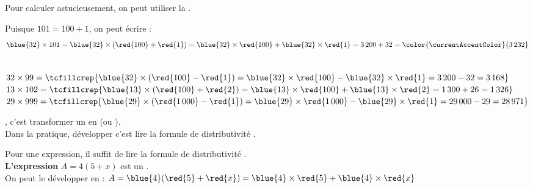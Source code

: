 \begin{Exemple}
    \vspace{-0.35cm}
    \begin{minipage}[t]{0.3\textwidth}\bclampe Pour calculer astucieusement, on peut utiliser la .\end{minipage}
    \hfill
    \begin{minipage}[t]{0.6\textwidth}
    Puisque $101 = 100 + 1$, on peut écrire :
    \[\blue{32} \times 101 = \blue{32} \times (\red{100} + \red{1}) = \blue{32} \times \red{100} + \blue{32} \times \red{1} = 3\,200 + 32 = \color{\currentAccentColor}{3\,232}\]
    \end{minipage}\\

    $32\times 99=\tcfillcrep{\blue{32} \times (\red{100} - \red{1}) = \blue{32} \times \red{100} - \blue{32} \times \red{1} = 3\,200 - 32 = 3\,168}$\\
    $13\times 102=\tcfillcrep{\blue{13} \times (\red{100} + \red{2}) = \blue{13} \times \red{100} + \blue{13} \times \red{2} = 1\,300 + 26 = 1\,326}$\\
    $29\times 999=\tcfillcrep{\blue{29} \times (\red{1\,000} - \red{1}) = \blue{29} \times \red{1\,000} - \blue{29} \times \red{1} = 29\,000 - 29 = 28\,971}$
\end{Exemple}
\begin{Definition}
    , c’est transformer un  en  (ou ).\\
    Dans la pratique, développer c’est lire la formule de distributivité .
\end{Definition}
\begin{Exemple}
    \bclampe Pour  une expression, il suffit de lire la formule de distributivité .\\
    \textbf{L'expression} $A = 4(5+x)$ est un . \\
    On peut le développer en : 
    $A = \blue{4}(\red{5}+\red{x}) = \blue{4}\times\red{5}+\blue{4}\times\red{x}$
\end{Exemple}

